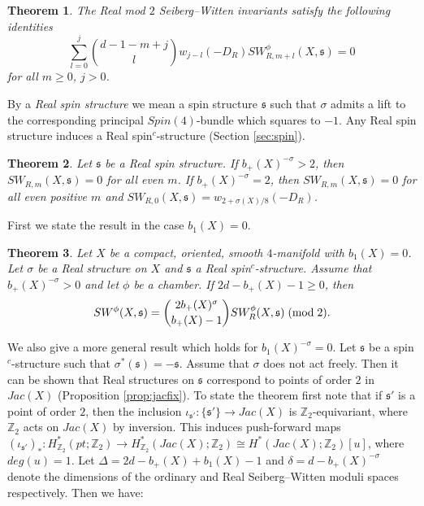 \documentclass{amsart}
\newtheorem{theorem}{Theorem}[section]
\theoremstyle{definition}
\theoremstyle{remark}
\numberwithin{equation}{section}
\begin{document}

\begin{theorem}
The Real mod $2$ Seiberg--Witten invariants satisfy the following identities
\[
\sum_{l=0}^j \binom{ d-1 - m + j}{l} w_{j-l}(-D_R) SW^\phi_{R,m+l}(X,\mathfrak{s}) = 0
\]
for all $m \ge 0$, $j > 0$.
\end{theorem}


 By a {\em Real spin structure} we mean a spin structure $\mathfrak{s}$ such that $\sigma$ admits a lift to the corresponding principal $Spin(4)$-bundle which squares to $-1$. Any Real spin structure induces a Real spin$^c$-structure (Section \ref{sec:spin}).

\begin{theorem}
Let $\mathfrak{s}$ be a Real spin structure. If $b_+(X)^{-\sigma} > 2$, then $SW_{R,m}(X,\mathfrak{s}) = 0$ for all even $m$. If $b_+(X)^{-\sigma} = 2$, then $SW_{R,m}(X,\mathfrak{s}) = 0$ for all even positive $m$ and $SW_{R,0}(X,\mathfrak{s}) = w_{2 + \sigma(X)/8}(-D_R)$.
\end{theorem}

 First we state the result in the case $b_1(X) = 0$.

\begin{theorem}
Let $X$ be a compact, oriented, smooth $4$-manifold with $b_1(X) = 0$. Let $\sigma$ be a Real structure on $X$ and $\mathfrak{s}$ a Real spin$^c$-structure. Assume that $b_+(X)^{-\sigma}>0$ and let $\phi$ be a chamber. If $2d - b_+(X) - 1 \ge 0$, then
\[
SW^\phi(X,\mathfrak{s}) = \binom{ 2b_+(X)^{\sigma} }{ b_+(X)-1 } SW^\phi_R(X,\mathfrak{s}) \; ({\rm mod} \; 2).
\]
\end{theorem}

We also give a more general result which holds for $b_1(X)^{-\sigma} = 0$. Let $\mathfrak{s}$ be a spin$^c$-structure such that $\sigma^*(\mathfrak{s}) = -\mathfrak{s}$. Assume that $\sigma$ does not act freely. Then it can be shown that Real structures on $\mathfrak{s}$ correspond to points of order $2$ in $Jac(X)$ (Proposition \ref{prop:jacfix}). To state the theorem first note that if $\mathfrak{s}'$ is a point of order $2$, then the inclusion $\iota_{\mathfrak{s}'} : \{ \mathfrak{s}' \} \to Jac(X)$ is $\mathbb{Z}_2$-equivariant, where $\mathbb{Z}_2$ acts on $Jac(X)$ by inversion. This induces push-forward maps $(\iota_{\mathfrak{s}'})_* : H^*_{\mathbb{Z}_2}(pt ; \mathbb{Z}_2) \to H^*_{\mathbb{Z}_2}(Jac(X) ; \mathbb{Z}_2) \cong H^*(Jac(X) ; \mathbb{Z}_2)[u]$, where $deg(u) = 1$. Let $\Delta = 2d - b_+(X) +b_1(X) - 1$ and $\delta = d - b_+(X)^{-\sigma}$ denote the dimensions of the ordinary and Real Seiberg--Witten moduli spaces respectively. Then we have:
\end{document}
